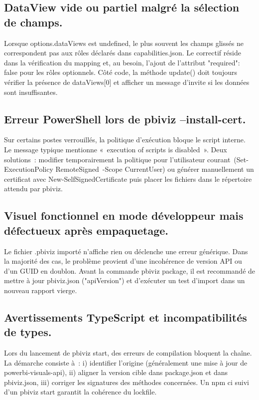 \subsection{DataView vide ou partiel malgré la sélection de champs.} Lorsque options.dataViews est undefined, le plus souvent les champs glissés ne correspondent pas aux rôles déclarés dans capabilities.json. Le correctif réside dans la vérification du mapping et, au besoin, l’ajout de l’attribut "required": false pour les rôles optionnels. Côté code, la méthode update() doit toujours vérifier la présence de dataViews[0] et afficher un message d’invite si les données sont insuffisantes.

\subsection{Erreur PowerShell lors de pbiviz --install-cert.} Sur certains postes verrouillés, la politique d’exécution bloque le script interne. Le message typique mentionne « execution of scripts is disabled ». Deux solutions : modifier temporairement la politique pour l’utilisateur courant (Set-ExecutionPolicy RemoteSigned -Scope CurrentUser) ou générer manuellement un certificat avec New-SelfSignedCertificate puis placer les fichiers dans le répertoire attendu par pbiviz.

\subsection{Visuel fonctionnel en mode développeur mais défectueux après empaquetage.} Le fichier .pbiviz importé n’affiche rien ou déclenche une erreur générique. Dans la majorité des cas, le problème provient d’une incohérence de version API ou d’un GUID en doublon. Avant la commande pbiviz package, il est recommandé de mettre à jour pbiviz.json ("apiVersion") et d’exécuter un test d’import dans un nouveau rapport vierge.

\subsection{Avertissements TypeScript et incompatibilités de types.} Lors du lancement de pbiviz start, des erreurs de compilation bloquent la chaîne. La démarche consiste à : i) identifier l’origine (généralement une mise à jour de powerbi-visuals-api), ii) aligner la version cible dans package.json et dans pbiviz.json, iii) corriger les signatures des méthodes concernées. Un npm ci suivi d’un pbiviz start garantit la cohérence du lockfile.

